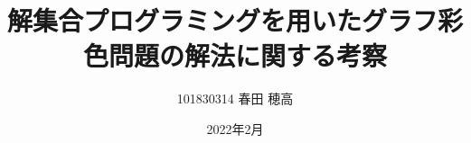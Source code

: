 \documentclass[a4paper,12pt,dvipdfmx,openany]{jbook}
\title{解集合プログラミングを用いたグラフ彩色問題の解法に関する考察}
\date{2022年2月}
\author{101830314 春田 穂高}
\begin{document}
\maketitle


\tableofcontents    %
\listoffigures      %
\listoftables       %
\lstlistoflistings  %









\end{document}

